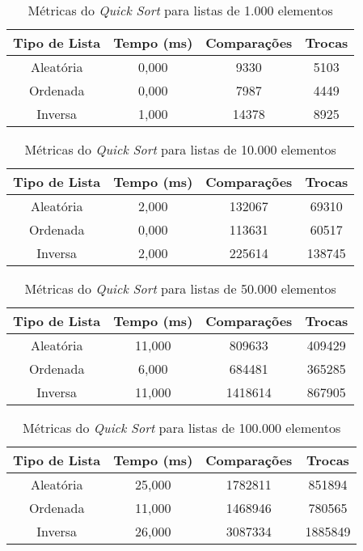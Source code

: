 \documentclass[a4paper,12pt]{article}
\begin{document}
\begin{table}[H]
\centering
\caption{Métricas do \textit{Quick Sort} para listas de 1.000 elementos}
\begin{tabular}{|c|c|c|c|}
\hline
\textbf{Tipo de Lista} & \textbf{Tempo (ms)} & \textbf{Comparações} & \textbf{Trocas} \\
\hline
Aleatória & 0,000 & 9330 & 5103 \\
\hline
Ordenada & 0,000 & 7987 & 4449 \\
\hline
Inversa & 1,000 & 14378 & 8925 \\
\hline
\end{tabular}
\end{table}

\begin{table}[H]
\centering
\caption{Métricas do \textit{Quick Sort} para listas de 10.000 elementos}
\begin{tabular}{|c|c|c|c|}
\hline
\textbf{Tipo de Lista} & \textbf{Tempo (ms)} & \textbf{Comparações} & \textbf{Trocas} \\
\hline
Aleatória & 2,000 & 132067 & 69310 \\
\hline
Ordenada & 0,000 & 113631 & 60517 \\
\hline
Inversa & 2,000 & 225614 & 138745 \\
\hline
\end{tabular}
\end{table}

\begin{table}[H]
\centering
\caption{Métricas do \textit{Quick Sort} para listas de 50.000 elementos}
\begin{tabular}{|c|c|c|c|}
\hline
\textbf{Tipo de Lista} & \textbf{Tempo (ms)} & \textbf{Comparações} & \textbf{Trocas} \\
\hline
Aleatória & 11,000 & 809633 & 409429 \\
\hline
Ordenada & 6,000 & 684481 & 365285 \\
\hline
Inversa & 11,000 & 1418614 & 867905 \\
\hline
\end{tabular}
\end{table}

\begin{table}[H]
\centering
\caption{Métricas do \textit{Quick Sort} para listas de 100.000 elementos}
\begin{tabular}{|c|c|c|c|}
\hline
\textbf{Tipo de Lista} & \textbf{Tempo (ms)} & \textbf{Comparações} & \textbf{Trocas} \\
\hline
Aleatória & 25,000 & 1782811 & 851894 \\
\hline
Ordenada & 11,000 & 1468946 & 780565 \\
\hline
Inversa & 26,000 & 3087334 & 1885849 \\
\hline
\end{tabular}
\end{table}
\end{document}
